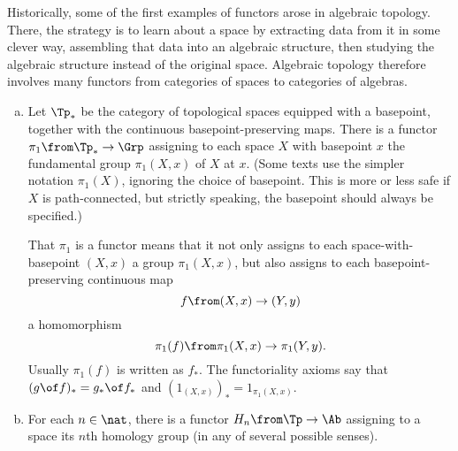 \begin{examples}
\label{egs:functors:homo-homo}
%
%
Historically, some of the first examples of functors arose in algebraic
topology.  There, the strategy is to learn about a space by extracting data
from it in some clever way, assembling that data into an algebraic
structure, then studying the algebraic structure instead of the original
space.  Algebraic topology therefore involves many functors from categories
of spaces to categories of algebras.
% 
\begin{enumerate}[(b)]
\item 
Let $\Tp_*$%
%
%
 be the category of topological spaces equipped with a
basepoint, together with the continuous basepoint-preserving maps.  There
is a functor $\pi_1\from \Tp_* \to \Grp$%
%
%
assigning to each space $X$ with basepoint $x$ the fundamental%
%
%
group $\pi_1(X, x)$ of $X$ at $x$.  (Some texts use the simpler notation
$\pi_1(X)$, ignoring the choice of basepoint.  This is more or less safe if
$X$ is path-connected, but strictly speaking, the basepoint should always
be specified.)

That $\pi_1$ is a functor means that it not only assigns to each
space-with-basepoint $(X, x)$ a group $\pi_1(X, x)$, but also assigns to
each basepoint-pre\-ser\-ving continuous map 
\[
f\from (X, x) \to (Y, y)
\]
a homomorphism 
\[
\pi_1(f)\from \pi_1(X, x) \to \pi_1(Y, y).
\]
Usually $\pi_1(f)$ is written as $f_*$.  The functoriality axioms say that $(g
\of f)_* = g_* \of f_*$ and $(1_{(X, x)})_* = 1_{\pi_1(X, x)}$.  

\item 
For each $n \in \nat$, there is a functor $H_n\from \Tp \to \Ab$%
%
%
assigning to a space its $n$th homology%
%
%
group (in any of several possible senses).
\end{enumerate}
\end{examples}

